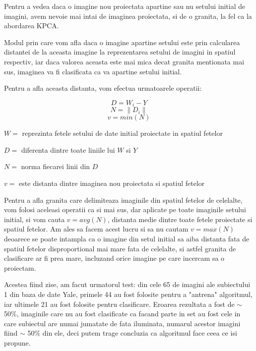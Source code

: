 \documentclass[12pt,oneside]{article}
\begin{document}
Pentru a vedea daca o imagine nou proiectata apartine sau nu setului initial de imagini, avem nevoie mai intai de imaginea proiectata, si de o granita, la fel ca la abordarea KPCA.

Modul prin care vom afla daca o imagine apartine setului este prin calcularea distantei de la aceasta imagine la reprezentarea setului de imagini in spatiul respectiv, iar daca valorea aceasta este mai mica decat granita mentionata mai sus, imaginea va fi clasificata ca va apartine setului initial.

Pentru a afla aceasta distanta, vom efectua urmatoarele operatii:

\begin{equation}
D=W_i-Y
\end{equation}
\begin{equation}
N=\| D_i  \|
\end{equation}
\begin{equation}
v=min(N)
\end{equation}

$W=$ reprezinta fetele setului de date initial proiectate in spatiul fetelor

$D=$ diferenta dintre toate liniile lui $W$ si $Y$

$N=$ norma fiecarei linii din $D$

$v=$ este distanta dintre imaginea nou proiectata si spatiul fetelor

Pentru a afla granita care delimiteaza imaginile din spatiul fetelor de celelalte, vom folosi aceleasi operatii ca si mai sus, dar aplicate pe toate imaginile setului initial, si vom cauta $v=avg(N)$, distanta medie dintre toate fetele proiectate si spatiul fetelor. Am ales sa facem acest lucru si sa nu cautam $v=max(N)$ deoarece se poate intampla ca o imagine din setul initial sa aiba distanta fata de spatiul fetelor disproportional mai mare fata de celelalte, si astfel granita de clasificare ar fi prea mare, incluzand orice imagine pe care incercam sa o proiectam.

Acestea fiind zise, am facut urmatorul test: din cele 65 de imagini ale subiectului 1 din baza de date Yale, primele 44 au fost folosite pentru a "antrena" algoritmul, iar ultimele 21 au fost folosite pentru clasificare. Eroarea rezultata a fost de $\sim$ 50\%, imaginile care nu au fost clasificate ca facand parte in set au fost cele in care subiectul are numai jumatate de fata iluminata, numarul acestor imagini fiind $\sim$ 50\% din ele, deci putem trage concluzia ca algoritmul face ceea ce isi propune. 
\end{document}
